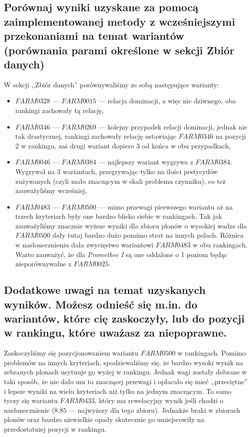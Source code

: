 \documentclass[11pt]{article}
\begin{document}
\subsection{Porównaj wyniki uzyskane za pomocą zaimplementowanej metody z wcześniejszymi przekonaniami na temat wariantów (porównania parami określone w sekcji Zbiór danych)}
W sekcji ,,Zbiór danych'' porównywaliśmy ze sobą następujące warianty:
\begin{itemize}
\item $FARM0328$ --- $FARM0015$ --- relacja dominacji, a więc nic dziwnego, oba rankingi zachowały tą relację,
\item $FARM0346$ --- $FARM0269$ --- kolejny przypadek relacji dominacji, jednak nie tak drastycznej, rankingi zachowały relację ustawiając $FARM0346$ na pozycji 2 w rankingu, zaś drugi wariant dopiero 3 od końca w obu przypadkach,
\item $FARM0046$ --- $FARM0384$ --- najlepszy wariant wygrywa z $FARM0384$. Wygrywał na 3 wariantach, przegrywając tylko na ilości pestycydów zużywanych (czyli mało znaczącym w skali problemu czynniku), co też zauważyliśmy wcześniej,
\item $FARM0483$ --- $FARM0500$ --- mimo przewagi pierwszego wariantu aż na trzech kryteriach były one bardzo blisko siebie w rankingach. Tak jak zauważyliśmy znacznie wyższe wyniki dla zbioru plonów o wysokiej wadze dla $FARM0500$ dały tutaj bardzo dużo pomimo strat na innych polach. Różnica w nasłonecznieniu dała zwycięstwo wariantowi $FARM0483$ w obu rankingach. Warto zauważyć, że dla \textit{Promethee I} są one oddalone o 1 poziom będąc nieporównywalne z $FARM0025$.
\end{itemize}

\subsection{Dodatkowe uwagi na temat uzyskanych wyników. Możesz odnieść się m.in. do wariantów, które cię zaskoczyły, lub do pozycji w rankingu, które uważasz za niepoprawne.}
Zaskoczyliśmy się pozycjonowaniem wariantu $FARM0500$ w rankingach. Pomimo problemów na innych kryteriach, spodziewaliśmy się, że bardzo wysoki wynik na zebranych plonach usytuuje go wyżej w rankingu. Jednak wagi zostały dobrane w taki sposób, że nie dało mu to znaczącej przewagi i opłacało się mieć ,,przeciętne'' i lepsze wyniki na wielu kryteriach niż tylko na jednym znaczącym. To samo tyczy się wariantu $FARM0433$, który ma rewelacyjny wynik jeśli chodzi o nasłonecznienie ($8.85$ --- najwyższy dla tego zbioru). Jednakże braki w zbiorach plonów oraz bardzo niewielkie opady skutecznie go umiejscowiły na przedostatniej pozycji w rankingu.
\end{document}
